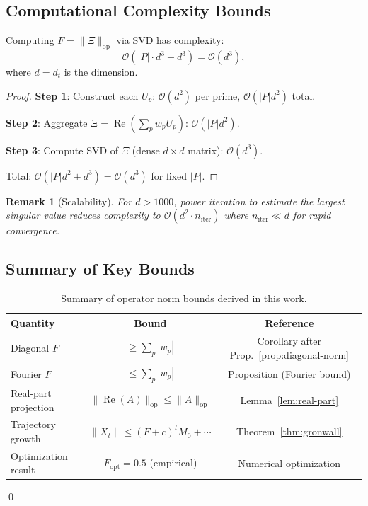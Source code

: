 \documentclass[11pt,a4paper]{article}
\newtheorem{remark}{Remark}
\begin{document}
\subsection{Computational Complexity Bounds}

\begin{proposition}
Computing \(F = \|\Xi\|_{\mathrm{op}}\) via SVD has complexity:
\[
\mathcal{O}(|P| \cdot d^3 + d^3) = \mathcal{O}(d^3),
\]
where \(d = d_t\) is the dimension.
\end{proposition}

\begin{proof}
\textbf{Step 1}: Construct each \(U_p\): \(\mathcal{O}(d^2)\) per prime, \(\mathcal{O}(|P| d^2)\) total.

\textbf{Step 2}: Aggregate \(\Xi = \operatorname{Re}(\sum_p w_p U_p)\): \(\mathcal{O}(|P| d^2)\).

\textbf{Step 3}: Compute SVD of \(\Xi\) (dense \(d \times d\) matrix): \(\mathcal{O}(d^3)\).

Total: \(\mathcal{O}(|P| d^2 + d^3) = \mathcal{O}(d^3)\) for fixed \(|P|\).
\end{proof}

\begin{remark}[Scalability]
For \(d > 1000\), power iteration to estimate the largest singular value reduces complexity to \(\mathcal{O}(d^2 \cdot n_{\text{iter}})\) where \(n_{\text{iter}} \ll d\) for rapid convergence.
\end{remark}

\subsection{Summary of Key Bounds}

\begin{table}[h]
\centering
\begin{tabular}{lcc}
\toprule
\textbf{Quantity} & \textbf{Bound} & \textbf{Reference} \\
\midrule
Diagonal \(F\) & \(\geq \sum_p |w_p|\) & Corollary after Prop.~\ref{prop:diagonal-norm} \\
Fourier \(F\) & \(\leq \sum_p |w_p|\) & Proposition (Fourier bound) \\
Real-part projection & \(\|\operatorname{Re}(A)\|_{\mathrm{op}} \leq \|A\|_{\mathrm{op}}\) & Lemma~\ref{lem:real-part} \\
Trajectory growth & \(\|X_t\| \leq (F+c)^t M_0 + \cdots\) & Theorem~\ref{thm:gronwall} \\
Optimization result & \(F_{\text{opt}} = 0.5\) (empirical) & Numerical optimization \\
\bottomrule
\end{tabular}
\caption{Summary of operator norm bounds derived in this work.}
\end{table}

\qed


\nocite{*}
  
  
\end{document}
